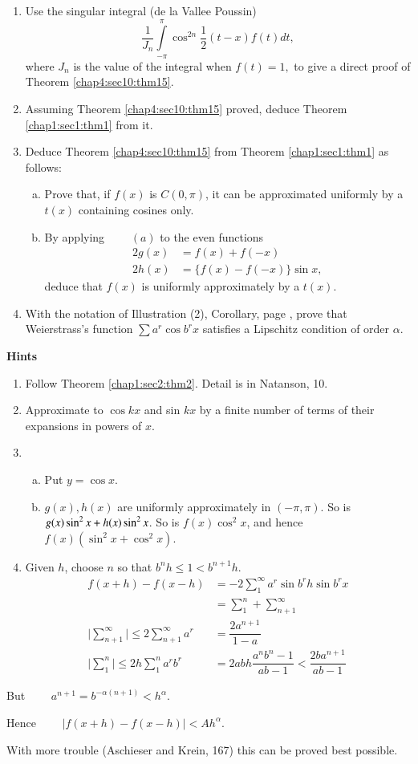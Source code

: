 \begin{enumerate}[1.]
\item Use the singular integral (de la Vallee Poussin)
  $$
  \frac{1}{J_n} \int\limits^{\pi}_{-\pi} \cos^{2n} \frac{1}{2} (t-x) f(t) dt,
  $$
  where $J_n$ is the value of the integral when $f(t) =1,$ to give a
  direct proof of Theorem \ref{chap4:sec10:thm15}. 
\item Assuming Theorem \ref{chap4:sec10:thm15} proved, deduce
  Theorem \ref{chap1:sec1:thm1} from it.
\item Deduce Theorem \ref{chap4:sec10:thm15} from Theorem
  \ref{chap1:sec1:thm1} as follows: 
  \begin{enumerate}[(a)]
  \item Prove that, if $f(x)$ is $C(0, \pi)$, it can be approximated
    uniformly by a $t(x)$ containing cosines only. 
  \item By applying $ \qquad (a)$ to the even functions
    \begin{align*}
      2g(x)& = f(x) + f(-x)\\
      2h(x)& = \bigg\{f(x) - f(-x) \bigg\} \sin x,
    \end{align*}
    deduce that $f(x)$ is uniformly approximately by a $t(x)$.
  \end{enumerate}
\item With the notation of Illustration (2), Corollary, page \pageref{page33},
  prove that Weierstrass's function $\sum a^r \cos b^r x$ satisfies a
  Lipschitz condition of order $\alpha$. 
\end{enumerate}

\begin{center}
\textbf{Hints}\pageoriginale
\end{center}

\begin{enumerate}[1]
\item Follow Theorem \ref{chap1:sec2:thm2}. Detail is in Natanson, 10.
\item Approximate to $\cos kx$ and sin $kx$ by a finite number of
  terms of their expansions in powers of $x$. 
\item
  \begin{enumerate}[(a)]
  \item Put $y = \cos x$.
  \item $g(x), h(x)$ are uniformly approximately in $(-\pi, \pi)$. So is
    $g(x)\break \sin^2 x + h(x) \sin^2 x$. So is $f(x) \cos^2 x$, and hence
    $f(x) (\sin^2x + \cos^2 x)$. 
  \end{enumerate}
\item Given $h$, choose $n$ so that $b^n h \leq 1 < b^{n+1}h$.
  \begin{align*}
    f(x+h)-f(x-h) & = -2 \sum^{\infty}_1 a^r \sin b^r h \sin b^r x\\
    & =  \sum^n_1 + \sum^{\infty}_{n+1}\\
    \bigg| \sum^{\infty}_{n+1} \bigg| \leq 2  \sum^{\infty}_{n+1}a^r &
    = \dfrac{2a^{n+1}}{1-a}\\ 
    \bigg|\sum^n_1\bigg| \leq 2h \sum^n_1 a^r b^r & = 2abh \dfrac{a^n
      b^n -1}{ab-1}< \dfrac{2b a^{n+1}}{ab-1}
  \end{align*}
\end{enumerate}

But $\qquad a^{n+1} = b^{-\alpha (n+1)}< h^{\alpha}$.

Hence  $\qquad | f(x+h) - f(x-h)| < A h^{\alpha}$.

With more trouble (Aschieser and Krein, 167) this can be proved best possible.
